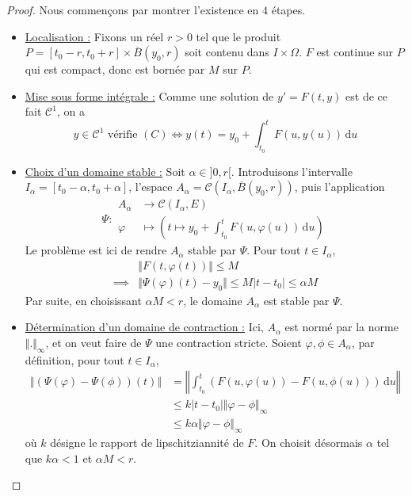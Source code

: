 	\begin{proof}
		Nous commençons par montrer l'existence en $4$ étapes.
		\begin{itemize}
			\item \uline{Localisation :} Fixons un réel $r > 0$ tel que le produit $P = [t_0 - r, t_0 + r] \times \overline{B}(y_0, r)$ soit contenu dans $I \times \Omega$. $F$ est continue sur $P$ qui est compact, donc est bornée par $M$ sur $P$.
			\item \uline{Mise sous forme intégrale :} Comme une solution de $y' = F(t, y)$ est de ce fait $\mathcal{C}^1$, on a
			\[ y \in \mathcal{C}^1 \text{ vérifie } (C) \iff y(t) = y_0 + \int_{t_0}^t F(u, y(u)) \, \mathrm{d}u \tag{$*$} \]
			\item \uline{Choix d'un domaine stable :} Soit $\alpha \in ]0, r[$. Introduisons l'intervalle $I_\alpha = [t_0 - \alpha, t_0 + \alpha]$, l'espace $A_\alpha = \mathcal{C}(I_\alpha, \overline{B}(y_0, r))$, puis l'application
			\[
			\Psi :
			\begin{array}{ll}
				A_\alpha &\rightarrow \mathcal{C}(I_\alpha, E)  \\
				\varphi &\mapsto \left(t \mapsto y_0 + \int_{t_0}^t F(u, \varphi(u)) \, \mathrm{d}u \right)
			\end{array}
			\]
			Le problème est ici de rendre $A_\alpha$ stable par $\Psi$. Pour tout $t \in I_\alpha$,
			\begin{align*}
				&\Vert F(t, \varphi(t)) \Vert \leq M \\
				\implies& \Vert \Psi(\varphi)(t) - y_0 \Vert \leq M |t-t_0| \leq \alpha M
			\end{align*}
			Par suite, en choisissant $\alpha M < r$, le domaine $A_\alpha$ est stable par $\Psi$.
			\item \uline{Détermination d'un domaine de contraction :} Ici, $A_\alpha$ est normé par la norme $\Vert . \Vert_{\infty}$, et on veut faire de $\Psi$ une contraction stricte. Soient $\varphi, \phi \in A_\alpha$, par définition, pour tout $t \in I_\alpha$,
			\begin{align*}
				\Vert (\Psi(\varphi) - \Psi(\phi)) (t) \Vert &= \left \Vert \int_{t_0}^t (F(u, \varphi(u)) - F(u, \phi(u))) \, \mathrm{d}u \right \Vert \\
				&\leq k |t-t_0| \Vert \varphi - \phi \Vert_\infty \\
				&\leq k \alpha \Vert \varphi - \phi \Vert_\infty
			\end{align*}
			où $k$ désigne le rapport de lipschitziannité de $F$. On choisit désormais $\alpha$ tel que $k \alpha < 1$ et $\alpha M < r$.

\end{itemize}
\end{proof}
